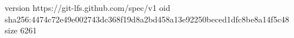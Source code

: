 version https://git-lfs.github.com/spec/v1
oid sha256:4474c72e49e002743dc368f19d8a2bd458a13e92250beced1dfc8be8a14f5c48
size 6261

